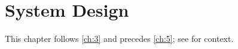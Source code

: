 \chapter{System Design}\label{ch:4}
\kant[9-10]

This chapter follows \cref{ch:3} and precedes \cref{ch:5}; see \citep{ch4-1,ch4-3} for context.
